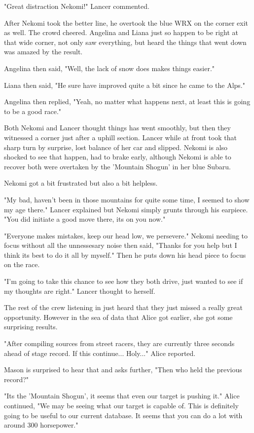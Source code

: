 "Great distraction Nekomi!" Lancer commented.

After Nekomi took the better line, he overtook the blue WRX on the corner exit as well. The crowd cheered. Angelina and Liana just so happen to be right at that wide corner, not only saw everything, but heard the things that went down was amazed by the result.

Angelina then said, "Well, the lack of snow does makes things easier."

Liana then said, "He sure have improved quite a bit since he came to the Alps."

Angelina then replied, "Yeah, no matter what happens next, at least this is going to be a good race."

Both Nekomi and Lancer thought things has went smoothly, but then they witnessed a corner just after a uphill section. 
Lancer while at front took that sharp turn by surprise, lost balance of her car and slipped. 
Nekomi is also shocked to see that happen, had to brake early, although Nekomi is able to recover both were overtaken by the 'Mountain Shogun' in her blue Subaru.

Nekomi got a bit frustrated but also a bit helpless.

"My bad, haven't been in those mountains for quite some time, I seemed to show my age there." Lancer explained but Nekomi simply grunts through his earpiece. "You did initiate a good move there, its on you now."

"Everyone makes mistakes, keep our head low, we persevere." Nekomi needing to focus without all the unnessesary noise then said, "Thanks for you help but I think its best to do it all by myself." Then he puts down his head piece to focus on the race.

"I'm going to take this chance to see how they both drive, just wanted to see if my thoughts are right." Lancer thought to herself.

The rest of the crew listening in just heard that they just missed a really great opportunity. However in the sea of data that Alice got earlier, she got some surprising results.

"After compiling sources from street racers, they are currently three seconds ahead of stage record. If this continue... Holy..." Alice reported.

Mason is surprised to hear that and asks further, "Then who held the previous record?"

"Its the 'Mountain Shogun', it seems that even our target is pushing it." Alice continued, "We may be seeing what our target is capable of. 
This is definitely going to be useful to our current database. It seems that you can do a lot with around 300 horsepower."

